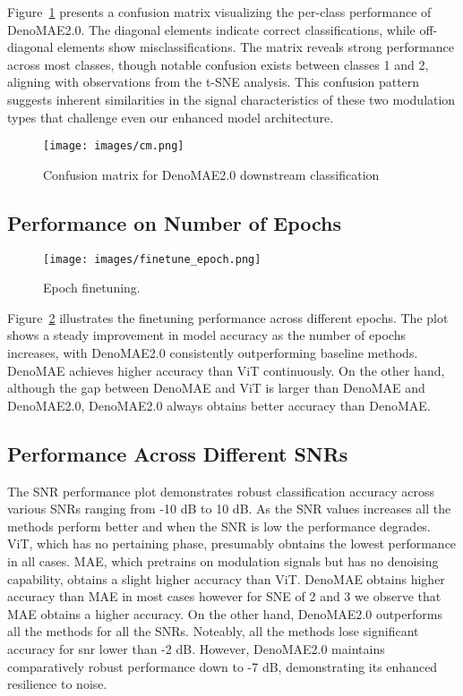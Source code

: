 Figure~\ref{fig:confusion} presents a confusion matrix visualizing the per-class performance of DenoMAE2.0. The diagonal elements indicate correct classifications, while off-diagonal elements show misclassifications. The matrix reveals strong performance across most classes, though notable confusion exists between classes 1 and 2, aligning with observations from the t-SNE analysis. This confusion pattern suggests inherent similarities in the signal characteristics of these two modulation types that challenge even our enhanced model architecture.

\begin{figure}[htbp]
    \centering
    \texttt{[image: images/cm.png]}
    \caption{Confusion matrix for DenoMAE2.0 downstream classification} 
    \label{fig:confusion}
\end{figure}

\subsection{Performance on Number of Epochs}

\begin{figure}[htbp]
    \centering
    \texttt{[image: images/finetune\_epoch.png]}
    \caption{Epoch finetuning.}
    \label{fig:epoch}
\end{figure}

Figure~\ref{fig:epoch} illustrates the finetuning performance across different epochs. The plot shows a steady improvement in model accuracy as the number of epochs increases, with DenoMAE2.0 consistently outperforming baseline methods. DenoMAE achieves higher accuracy than ViT continuously. On the other hand, although the gap between DenoMAE and ViT is larger than DenoMAE and DenoMAE2.0, DenoMAE2.0 always obtains better accuracy than DenoMAE.

\subsection{Performance Across Different SNRs}

The SNR performance plot demonstrates robust classification accuracy across various SNRs ranging from -10 dB to 10 dB. As the SNR values increases all the methods perform better and when the SNR is low the performance degrades. ViT, which has no pertaining phase, presumably obntains the lowest performance in all cases. MAE, which pretrains on modulation signals but has no denoising capability, obtains a slight higher accuracy than ViT. DenoMAE obtains higher accuracy than MAE in most cases however for SNE of 2 and 3 we observe that MAE obtains a higher accuracy. On the other hand, DenoMAE2.0 outperforms all the methods for all the SNRs.  Noteably, all the methods lose significant accuracy for snr lower than -2 dB. However, DenoMAE2.0 maintains comparatively robust performance down to -7 dB, demonstrating its enhanced resilience to noise.

